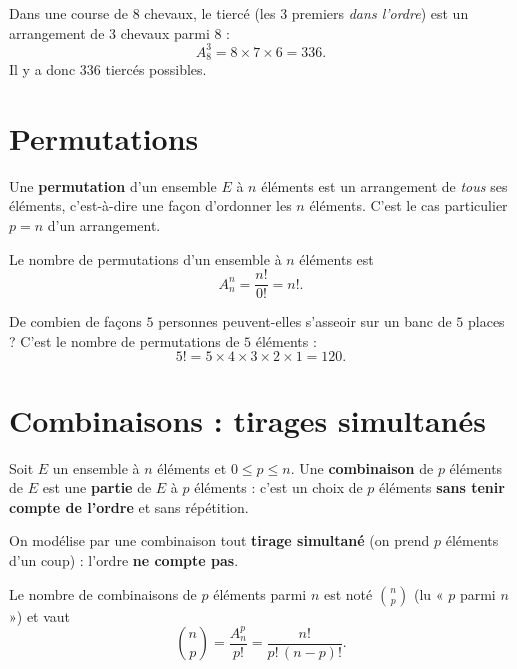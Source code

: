 \begin{exemple}
Dans une course de $8$ chevaux, le tiercé (les $3$ premiers \emph{dans l'ordre}) est
un arrangement de $3$ chevaux parmi $8$ :
\[ A_8^3=8\times 7\times 6=336. \]
Il y a donc $336$ tiercés possibles.
\end{exemple}

\section{Permutations}

\begin{definition}[Permutation]
Une \textbf{permutation} d'un ensemble $E$ à $n$ éléments est un arrangement de
\emph{tous} ses éléments, c'est-à-dire une façon d'ordonner les $n$ éléments. C'est le
cas particulier $p=n$ d'un arrangement.
\end{definition}

\begin{theoreme}
Le nombre de permutations d'un ensemble à $n$ éléments est
\[ A_n^n=\frac{n!}{0!}=n!. \]
\end{theoreme}

\begin{exemple}
De combien de façons $5$ personnes peuvent-elles s'asseoir sur un banc de $5$ places ?
C'est le nombre de permutations de $5$ éléments :
\[ 5!=5\times 4\times 3\times 2\times 1=120. \]
\end{exemple}

\section{Combinaisons : tirages simultanés}

\begin{definition}[Combinaison]
Soit $E$ un ensemble à $n$ éléments et $0\le p\le n$. Une \textbf{combinaison} de $p$
éléments de $E$ est une \textbf{partie} de $E$ à $p$ éléments : c'est un choix de $p$
éléments \textbf{sans tenir compte de l'ordre} et sans répétition.
\end{definition}

On modélise par une combinaison tout \textbf{tirage simultané} (on prend $p$ éléments
d'un coup) : l'ordre \textbf{ne compte pas}.

\begin{theoreme}
Le nombre de combinaisons de $p$ éléments parmi $n$ est noté $\binom{n}{p}$ (lu
« $p$ parmi $n$ ») et vaut
\[ \binom{n}{p}=\frac{A_n^p}{p!}=\frac{n!}{p!\,(n-p)!}. \]
\end{theoreme}

